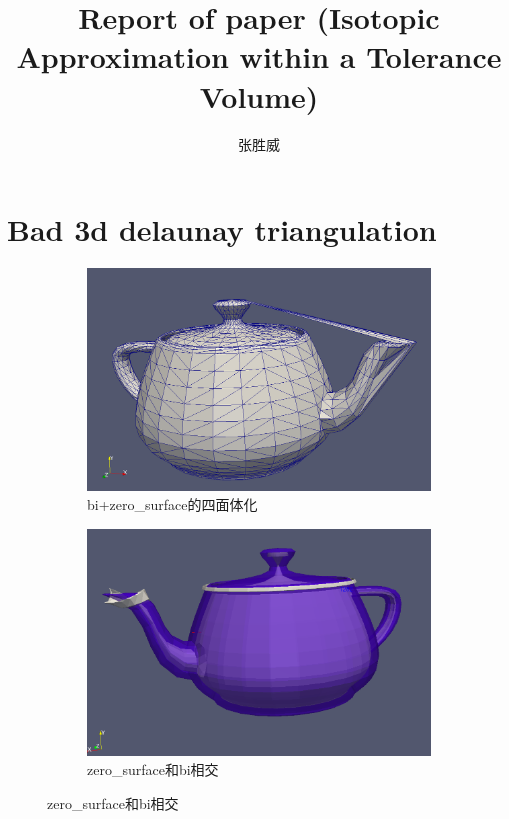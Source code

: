 \documentclass{article}
\title{Report of paper (Isotopic Approximation within a Tolerance Volume)}
\author{张胜威\\
}
\theoremstyle{definition}
\theoremstyle{remark}
\begin{document}
\maketitle

\section{Bad 3d delaunay triangulation}
  \begin{figure}[h]
    \begin{subfigure}[b]{0.4\textwidth}
      \includegraphics[width=\textwidth]{bad_surface0.png}
      \caption[现象]{bi+zero\_surface的四面体化}
    \end{subfigure}
    \begin{subfigure}[b]{0.4\textwidth}
      \includegraphics[width=\textwidth]{bad_surface1.png}
      \caption[原因]{zero\_surface和bi相交}
    \end{subfigure}
  \end{figure}
\end{document}
